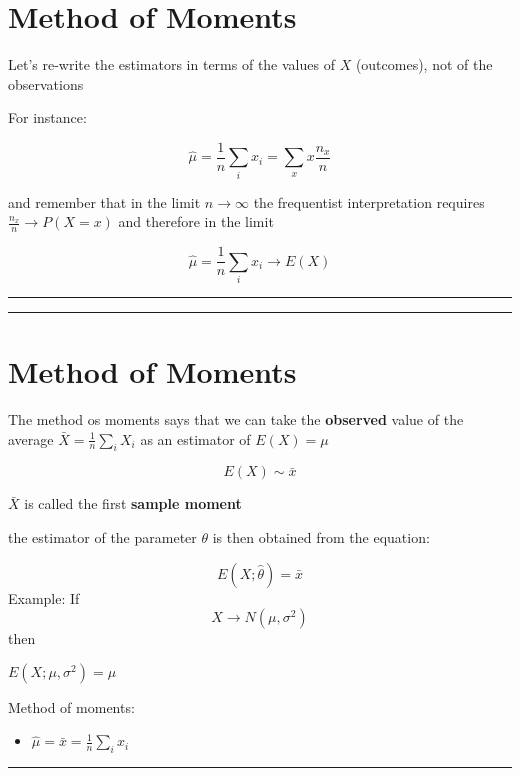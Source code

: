 \documentclass[
]{book}
\providecommand{\tightlist}{%
  \setlength{\itemsep}{0pt}\setlength{\parskip}{0pt}}
\begin{document}
\hypertarget{method-of-moments-1}{%
\section{Method of Moments}\label{method-of-moments-1}}

Let's re-write the estimators in terms of the values of \(X\) (outcomes), not of the observations

For instance:

\[\hat{\mu}=\frac{1}{n}\sum_i x_i= \sum_x x \frac{n_x}{n}\]

and remember that in the limit \(n \rightarrow \infty\) the frequentist interpretation requires \(\frac{n_x}{n} \rightarrow P(X=x)\) and therefore in the limit

\[\hat{\mu}=\frac{1}{n}\sum_i x_i \rightarrow E(X)\]

\begin{center}\rule{0.5\linewidth}{0.5pt}\end{center}

\begin{center}\rule{0.5\linewidth}{0.5pt}\end{center}

\hypertarget{method-of-moments-2}{%
\section{Method of Moments}\label{method-of-moments-2}}

The method os moments says that we can take the \textbf{observed} value of the average \(\bar{X}= \frac{1}{n}\sum_i X_i\) as an estimator of \(E(X)=\mu\)

\[ E(X)\sim \bar{x}\]

\(\bar{X}\) is called the first \textbf{sample moment}

the estimator of the parameter \(\theta\) is then obtained from the equation:

\[E(X; \hat{\theta})=\bar{x}\]
Example: If
\[X \rightarrow N(\mu, \sigma^2)\] then

\(E(X; \mu, \sigma^2)=\mu\)

Method of moments:

\begin{itemize}
\tightlist
\item
  \(\hat{\mu}=\bar{x}=\frac{1}{n}\sum_i x_i\)
\end{itemize}

\begin{center}\rule{0.5\linewidth}{0.5pt}\end{center}
\end{document}

